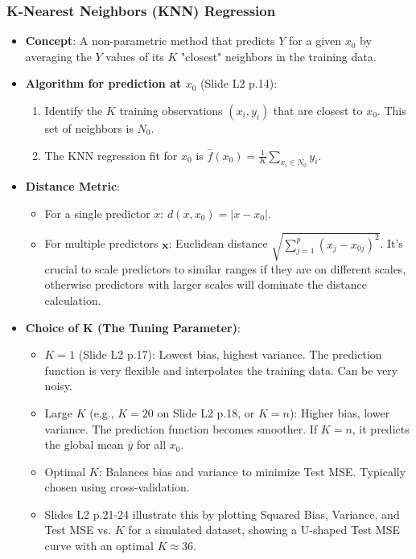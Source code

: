 \documentclass[12pt,a4paper]{article}
\begin{document}
\begin{itemize}
    \subsubsection{K-Nearest Neighbors (KNN) Regression }
        \begin{itemize}
            \item \textbf{Concept}: A non-parametric method that predicts $Y$ for a given $x_0$ by averaging the $Y$ values of its $K$ "closest" neighbors in the training data.
            \item \textbf{Algorithm for prediction at $x_0$} (Slide L2 p.14):
                \begin{enumerate}
                    \item Identify the $K$ training observations $(x_i, y_i)$ that are closest to $x_0$. This set of neighbors is $N_0$.
                    \item The KNN regression fit for $x_0$ is $\hat{f}(x_0) = \frac{1}{K} \sum_{x_i \in N_0} y_i$.
                \end{enumerate}
            \item \textbf{Distance Metric}:
                \begin{itemize}
                    \item For a single predictor $x$: $d(x, x_0) = |x - x_0|$.
                    \item For multiple predictors $\mathbf{x}$: Euclidean distance $\sqrt{\sum_{j=1}^p (x_j - x_{0j})^2}$. It's crucial to scale predictors to similar ranges if they are on different scales, otherwise predictors with larger scales will dominate the distance calculation.
                \end{itemize}
            \item \textbf{Choice of K (The Tuning Parameter)}:
                \begin{itemize}
                    \item $K=1$ (Slide L2 p.17): Lowest bias, highest variance. The prediction function is very flexible and interpolates the training data. Can be very noisy.
                    \item Large $K$ (e.g., $K=20$ on Slide L2 p.18, or $K=n$): Higher bias, lower variance. The prediction function becomes smoother. If $K=n$, it predicts the global mean $\bar{y}$ for all $x_0$.
                    \item Optimal $K$: Balances bias and variance to minimize Test MSE. Typically chosen using cross-validation.
                    \item Slides L2 p.21-24 illustrate this by plotting Squared Bias, Variance, and Test MSE vs. $K$ for a simulated dataset, showing a U-shaped Test MSE curve with an optimal $K \approx 36$.

\end{itemize}
\end{itemize}
\end{itemize}
\end{document}
